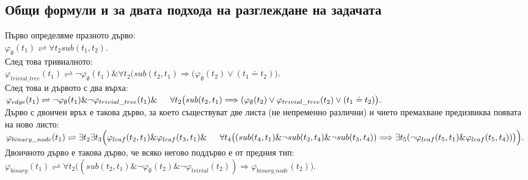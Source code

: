 \documentclass{article}
\begin{document}
\subsection{Общи формули и за двата подхода на разглеждане на задачата}
\begin{addmargin}[1em]{2em}
Първо определяме празното дърво:\\
$ \varphi_{\emptyset}(t_1) \rightleftharpoons \forall t_2sub(t_1, t_2). $\\
След това тривиалното: \\
$ \varphi_{trivial\_tree}(t_1) \rightleftharpoons \neg\varphi_{\emptyset}(t_1) \& \forall t_2 \big( sub(t_2, t_1) \Longrightarrow (\varphi_{\emptyset}(t_2) \lor (t_1 \doteq t_2)\big). $\\
След това и дървото с два върха: \\
$ \varphi_{edge}(t_1) \rightleftharpoons \neg\varphi_{\emptyset}(t_1) \& \neg\varphi_{trivial\_tree}(t_1) \& \\ \indent  \forall t_2 \big( sub(t_2, t_1) \Longrightarrow (\varphi_{\emptyset}(t_2) \lor \varphi_{trivial\_tree}(t_2) \lor (t_1 \doteq t_2) \big). $\\
Дърво с двоичен връх е такова дърво, за което съществуват две листа (не непременно различни) и чието премахване предизвиква появата на ново листо: \\
$ \varphi_{binary\_node}(t_1) \rightleftharpoons \exists t_2 \exists t_3 \Big( \varphi_{leaf}(t_2, t_1) \& \varphi_{leaf}(t_3, t_1) \& \\ \indent \forall t_4 \big((sub(t_4, t_1) \& \neg sub(t_2, t_4) \& \neg sub(t_3, t_4)) \Longrightarrow \exists t_5 ( \neg \varphi_{leaf}(t_5, t_1) \& \varphi_{leaf}(t_5, t_4)) \big) \Big).$ \\
Двоичното дърво е такова дърво, че всяко негово поддърво е от предния тип: \\
$ \varphi_{binary}(t_1) \rightleftharpoons \forall t_2 \big((sub(t_2, t_1) \& \neg\varphi_{\emptyset}(t_2) \& \neg\varphi_{trivial}(t_2) )\Longrightarrow \varphi_{binary\_node}(t_2)\big) .$
\end{addmargin}

\vskip 0.2in
\end{document}
